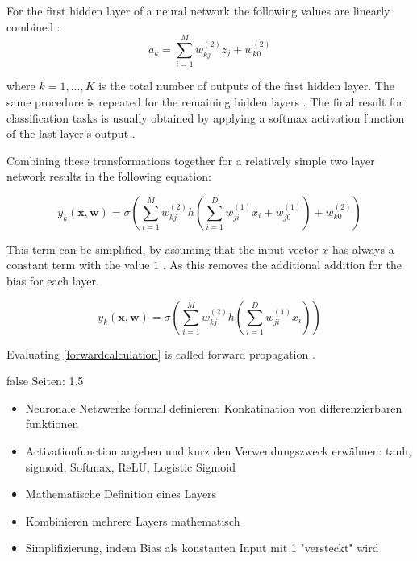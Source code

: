 \documentclass[draft,final,oneside]{vutinfth} %
\begin{document}
For the first hidden layer of a neural network the following values are linearly combined \cite{bishop}:
\begin{equation}
a_k = \sum_{i=1}^{M} w_{kj}^{(2)}z_j + w_{k0}^{(2)}
\end{equation}

where $k = 1, ..., K$ is the total number of outputs of the first hidden layer. The same procedure is repeated for the remaining hidden layers \cite{bishop}. The final result for classification tasks is usually obtained by applying a softmax activation function of the last layer's output \cite{bishop}.

Combining these transformations together for a relatively simple two layer network results in the following equation:

\begin{equation}
y_k(\boldsymbol{x}, \boldsymbol{w}) = \sigma\left(\sum_{i=1}^{M} w_{kj}^{(2)}h\left(\sum_{i=1}^{D} w_{ji}^{(1)}x_i + w_{j0}^{(1)}\right) + w_{k0}^{(2)}\right)
\end{equation}

This term can be simplified, by assuming that the input vector $x$ has always a constant term with the value $1$ \cite{bishop}. As this removes the additional addition for the bias for each layer.

\begin{equation} \label{forwardcalculation}
y_k(\boldsymbol{x}, \boldsymbol{w}) = \sigma\left(\sum_{i=1}^{M} w_{kj}^{(2)}h\left(\sum_{i=1}^{D} w_{ji}^{(1)}x_i\right)\right)
\end{equation}

Evaluating \ref{forwardcalculation} is called forward propagation \cite{colahbackprop}.

\if false
Seiten: 1.5
\begin{itemize}
\item Neuronale Netzwerke formal definieren: Konkatination von differenzierbaren funktionen
\item Activationfunction angeben und kurz den Verwendungszweck erwähnen: tanh, sigmoid, Softmax, ReLU, Logistic Sigmoid
\item Mathematische Definition eines Layers
\item Kombinieren mehrere Layers mathematisch
\item Simplifizierung, indem Bias als konstanten Input mit 1 "versteckt" wird

\end{itemize}

\fi
\end{document}
